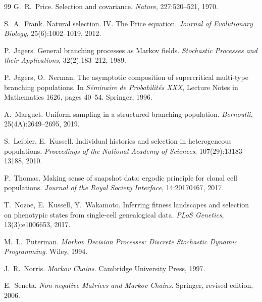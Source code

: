 \documentclass[a4paper, 11pt]{article}
\theoremstyle{plain}
\theoremstyle{remark}
\begin{document}
\begin{thebibliography}{99}
G.~R.~Price.
\newblock Selection and covariance.
\newblock \emph{Nature}, 227:520--521, 1970.

S.~A.~Frank.
\newblock Natural selection. IV. The Price equation.
\newblock \emph{Journal of Evolutionary Biology}, 25(6):1002--1019, 2012.

P.~Jagers.
\newblock General branching processes as Markov fields.
\newblock \emph{Stochastic Processes and their Applications}, 32(2):183--212, 1989.

P.~Jagers, O.~Nerman.
\newblock The asymptotic composition of supercritical multi-type branching populations.
\newblock In \emph{Séminaire de Probabilités XXX}, Lecture Notes in Mathematics 1626, pages 40--54. Springer, 1996.

A.~Marguet.
\newblock Uniform sampling in a structured branching population.
\newblock \emph{Bernoulli}, 25(4A):2649--2695, 2019.

S.~Leibler, E.~Kussell.
\newblock Individual histories and selection in heterogeneous populations.
\newblock \emph{Proceedings of the National Academy of Sciences}, 107(29):13183--13188, 2010.

P.~Thomas.
\newblock Making sense of snapshot data: ergodic principle for clonal cell populations.
\newblock \emph{Journal of the Royal Society Interface}, 14:20170467, 2017.

T.~Nozoe, E.~Kussell, Y.~Wakamoto.
\newblock Inferring fitness landscapes and selection on phenotypic states from single-cell genealogical data.
\newblock \emph{PLoS Genetics}, 13(3):e1006653, 2017.

M.~L.~Puterman.
\newblock \emph{Markov Decision Processes: Discrete Stochastic Dynamic Programming}.
\newblock Wiley, 1994.

\ifsimplified\else
{}
J.~R.~Norris.
\newblock \emph{Markov Chains}.
\newblock Cambridge University Press, 1997.

E.~Seneta.
\newblock \emph{Non-negative Matrices and Markov Chains}.
\newblock Springer, revised edition, 2006.
\fi

\end{thebibliography}
\end{document}
